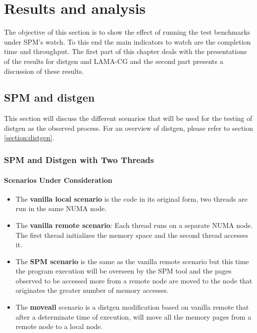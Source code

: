 \chapter{Results and analysis}\label{chapter:res-analysis}
The objective of this section is to show the effect of running the test benchmarks under SPM's watch. To this end the main indicators to watch are the completion time and throughput. The first part of this chapter deals with the presentations of the results for distgen and LAMA-CG and the second part presents a discussion of these results.
 
\section{SPM and distgen}\label{section:spmydistgen}
This section will discuss the different scenarios that will be used for the testing of distgen as the observed process. For an overview of distgen, please refer to section \ref{section:distgen}.
\subsection{SPM and Distgen with Two Threads}\label{subsection:res-spmydistgen-2t}

\subsubsection{Scenarios Under Consideration}\label{subsection:res-scenarios-2t-scens}

\begin{itemize}
	\item The \textbf{vanilla local scenario} is the code in its original form, two threads are run in the same NUMA node.
	\item The \textbf{vanilla remote scenario}: Each thread runs on a separate NUMA node. The first thread initializes the memory space and the second thread accesses it. 
	\item The \textbf{SPM scenario} is the same as the vanilla remote scenario but this time the program execution will be overseen by the SPM tool and the pages observed to be accessed more from a remote node are moved to the node that originates the greater number of memory accesses.
	\item The \textbf{moveall} scenario is a distgen modification based on vanilla remote that after a determinate time of execution, will move all the memory pages from a remote node to a local node.
\end{itemize}


